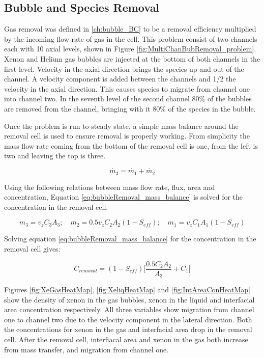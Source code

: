 \subsection{Bubble and Species Removal}
Gas removal was defined in \ref{ch:bubble_BC} to be a removal efficiency multiplied by the incoming flow rate of gas in the cell.  This problem consist of two channels each with 10 axial levels, shown in Figure
\ref{fig:MultiChanBubRemoval_problem}. Xenon and Helium gas bubbles are injected at the bottom of both channels in the first level. Velocity in the axial direction brings the species up and out of the channel. A velocity component is added between the channels and 1/2 the velocity in the axial direction. This causes species to migrate from channel one into channel two. In the seventh level of the second channel 80\% of the bubbles are removed from the channel, bringing with it 80\% of the species in the bubble. 

 Once the problem is run to steady state, a simple mass balance around the removal cell is used to ensure removal is properly working. From simplicity the mass flow rate coming from the bottom of the removal cell is one, from the left is two and leaving the top is three. 
 
\begin{equation}
    \dot{m_{3}} = \dot{m_{1}} + \dot{m_{2}}
    \label{eq:bubbleRemoval_mass_balance}
\end{equation}

Using the following relations between mass flow rate, flux, area and concentration, Equation \ref{eq:bubbleRemoval_mass_balance} is solved for the concentration in the removal cell.

\begin{equation}
    m_{3} = v_{z}C_{3}A_{3}; \quad m_{2} = 0.5v_{z}C_{2}A_{2}(1-S_{eff}); \quad m_{1} = v_{z}C_{1}A_{1}(1-S_{eff})
\end{equation}

Solving equation \ref{eq:bubbleRemoval_mass_balance} for the concentration in the removal cell gives:

\begin{equation}
    C_{removal} = (1-S_{eff}) \bigg[\frac{0.5C_{2}A_{2}}{A_{3}} + C_{1}\bigg]
\end{equation}

Figures \ref{fig:XeGasHeatMap}, \ref{fig:XeliqHeatMap} and \ref{fig:IntAreaConHeatMap} show the density of xenon in the gas bubbles, xenon in the liquid and interfacial area concentration respectively.  All three variables show migration from channel one to channel two due to the velocity component in the lateral direction. Both the concentrations for xenon in the gas and interfacial area drop in the removal cell. After the removal cell, interfiacal area and xenon in the gas both increase from mass transfer, and migration from channel one. 


